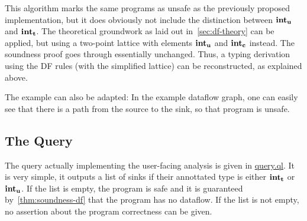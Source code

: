 This algorithm marks the same programs as unsafe as the previously proposed implementation,
but it does obviously not include the distinction between $\textbf{int}_\textbf{u}$ and $\textbf{int}_\textbf{t}$.
The theoretical groundwork as laid out in~\autoref{sec:df-theory} can be applied,
but using a two-point lattice with elements $\textbf{int}_\textbf{u}$ and $\textbf{int}_\textbf{c}$ instead.
The soundness proof goes through essentially unchanged.
Thus, a typing derivation using the DF rules (with the simplified lattice) 
can be reconstructed, as explained above.

The example can also be adapted: In the example dataflow graph, one can easily
see that there is a path from the source to the sink, so that program is unsafe.

\subsection{The Query}
The query actually implementing the user-facing analysis is given in \hyperref[lst:query]{query.ql}.
It is very simple, it outputs a list of sinks if their annottated type is 
either $\textbf{int}_\textbf{t}$ or $\textbf{int}_\textbf{u}$.
If the list is empty, the program is safe and it is guaranteed by~\autoref{thm:soundness-df}
that the program has no dataflow.
If the list is not empty, no assertion about the program correctness can be given.

